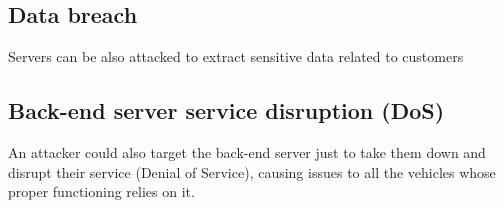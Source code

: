 \subsection*{Data breach}
Servers can be also attacked to extract sensitive data related to customers

\subsection*{Back-end server service disruption (DoS)}
An attacker could also target the back-end server just to take them down and disrupt their service (Denial of Service), causing issues to all the vehicles whose proper functioning relies on it.